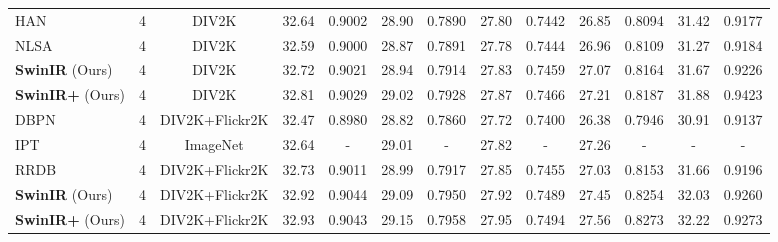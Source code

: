 \documentclass[10pt,twocolumn,letterpaper]{article}
\newcommand{\R}[1]{\textcolor[rgb]{1.00,0.00,0.00}{#1}}
\newcommand{\B}[1]{\textcolor[rgb]{0.00,0.00,1.00}{#1}}
\newcommand{\algname}{SwinIR}
\newlength \g
\begin{document}
\begin{table*}[t]
\begin{center}
\begin{tabular}{|l|c|c|c|c|c|c|c|c|c|c|c|c|}
HAN~\cite{niu2020HAN}  & 4  & DIV2K
& {32.64}
& {0.9002}
& {28.90}
& {0.7890}
& {27.80}
& {0.7442}
& {26.85}
& {0.8094}
& {31.42}
& {0.9177}
\\
NLSA~\cite{mei2021NLSA} & 4 & DIV2K
& 32.59 
& 0.9000 
& 28.87 
& 0.7891 
& 27.78 
& 0.7444 
& {26.96}
& {0.8109}
& 31.27 
& 0.9184
\\
\textbf{\algname{}} (Ours)  & 4  & DIV2K
& \B{32.72}
& \B{0.9021}
& \B{28.94}
& \B{0.7914}
& \B{27.83}
& \B{0.7459}
& \B{27.07}
& \B{0.8164}
& \B{31.67}
& \B{0.9226}
\\
\textbf{\algname{}+} (Ours)  & 4  & DIV2K
& \R{32.81}
& \R{0.9029}
& \R{29.02}
& \R{0.7928}
& \R{27.87}
& \R{0.7466}
& \B{27.21}
& \R{0.8187}
& \R{31.88}
& \R{0.9423}
\\
\hdashline
DBPN~\cite{haris2018DBPN} & 4 & DIV2K+Flickr2K
& 32.47
& 0.8980
& 28.82
& 0.7860
& 27.72
& 0.7400
& 26.38
& 0.7946
& 30.91
& 0.9137
\\
IPT~\cite{chen2021IPT} & 4 & ImageNet
& {32.64}
& {-}
& {29.01}
& {-}
& {27.82}
& {-}
& {27.26}
& {-}
& {-}
& {-}
\\
RRDB~\cite{wang2018esrgan} & 4 & DIV2K+Flickr2K
& {32.73}
& {0.9011 }
& {28.99}
& {0.7917}
& {27.85}
& {0.7455}
& {27.03}
& {0.8153}
& {31.66}
& {0.9196}
\\
\textbf{\algname{}} (Ours)  & 4  & DIV2K+Flickr2K
& \B{32.92}
& \B{0.9044}
& \B{29.09}
& \B{0.7950}
& \B{27.92}
& \B{0.7489}
& \B{27.45}
& \B{0.8254}
& \B{32.03}
& \B{0.9260}
\\
\textbf{\algname{}+} (Ours)  & 4  & DIV2K+Flickr2K
& \R{32.93}
& \R{0.9043}
& \R{29.15}
& \R{0.7958}
& \R{27.95}
& \R{0.7494}
& \R{27.56}
& \R{0.8273}
& \R{32.22}
& \R{0.9273}
\\
\hline             
\end{tabular}
\end{center}
\vspace{1mm}
\end{table*}
\end{document}
